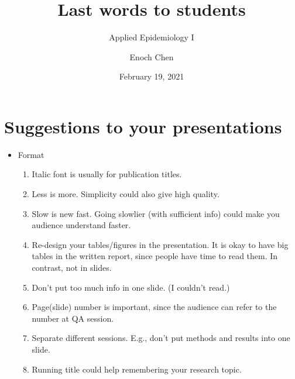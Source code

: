 \documentclass{beamer}
\title{Last words to students}
\subtitle{Applied Epidemiology I}
\date{February 19, 2021}
\author[Enoch Chen]{Enoch Chen}
\institute[MEB, Karolinska Insitutet]{Department of Medical Epidemiology and Biostatistics \\Karolinska Insitutet}
\begin{document}
\begin{frame}
\maketitle 
\end{frame}

\section{Suggestions to your presentations}
\begin{frame}{\secname}
\begin{itemize}
	\item Format
	\begin{enumerate}
		\item  Italic font is usually for publication titles.
		\item  Less is more. Simplicity could also give high quality. 
		\item Slow is new fast. Going slowlier (with sufficient info) could make you audience understand faster.
		\item Re-design your tables/figures in the presentation. It is okay to have big tables in the written report, since people have time to read them. In contrast, not in slides.
		\item Don't put too much info in one slide. (I couldn't read.)
		\item Page(slide) number is important, since the audience can refer to the number at QA session.
		\item Separate different sessions. E.g., don't put methods and results into one slide.
		\item Running title could help remembering your research topic.
	\end{enumerate}
\end{itemize}
\end{frame}
\end{document}
